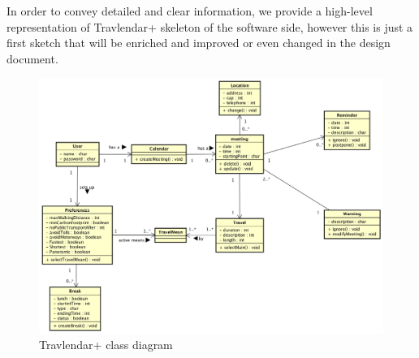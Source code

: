 
\begin{flushleft}
	In order to convey detailed and clear information, we provide a high-level representation of Travlendar+ skeleton of the software side, however this is just a first sketch that will be enriched and improved or even changed in the design document. \\
\end{flushleft}

\begin{figure}
	\centering
	\includegraphics[width=0.7\linewidth]{classdiagrams/ClassDiagramTravlendar+}
	\caption{Travlendar+ class diagram}
	\label{fig:classdiagramtravlendar}
\end{figure}
